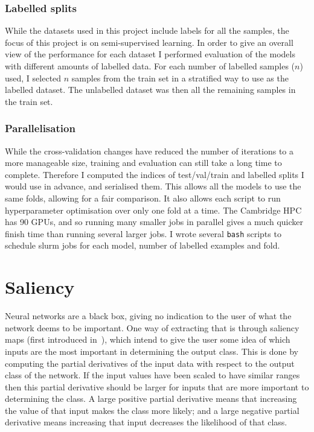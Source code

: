 \subsubsection{Labelled splits}
While the datasets used in this project include labels for all the samples, the focus of this project is on semi-supervised learning.
In order to give an overall view of the performance for each dataset I performed evaluation of the models with different amounts of
labelled data. For each number of labelled samples ($n$) used, I selected $n$ samples from the train set in a stratified way to use as the 
labelled dataset. The unlabelled dataset was then all the remaining samples in the train set.

\subsubsection{Parallelisation}
While the cross-validation changes have reduced the number of iterations to a more manageable size, training and evaluation can still take a long time 
to complete. Therefore I computed the indices of test/val/train and labelled 
splits I would use in advance, and serialised them. This allows all the models to use the same folds, allowing
for a fair comparison. It also allows each script to run hyperparameter optimisation over only one fold at a time. The Cambridge HPC 
has 90 GPUs, and so running many smaller jobs in parallel gives a much quicker finish time than running several larger jobs.
I wrote several \texttt{bash} scripts to schedule slurm jobs for each model, number of labelled examples and fold. 

\section{Saliency} \label{saliency}
Neural networks are a black box, giving no indication to the user of what the network deems 
to be important. One way of extracting that is through saliency maps (first introduced in~\cite{DBLP:journals/corr/SimonyanVZ13}), 
which intend to give the user some idea of which inputs 
are the most important in determining the output class. This is done by computing the partial derivatives of the input data 
with respect to the output class of the network. If the input values have been scaled to have similar ranges then this partial derivative
should be larger for inputs that are more important to determining the class. A large positive partial derivative means that increasing 
the value of that input makes the class more likely; and a large negative partial derivative means increasing that input decreases the 
likelihood of that class.

